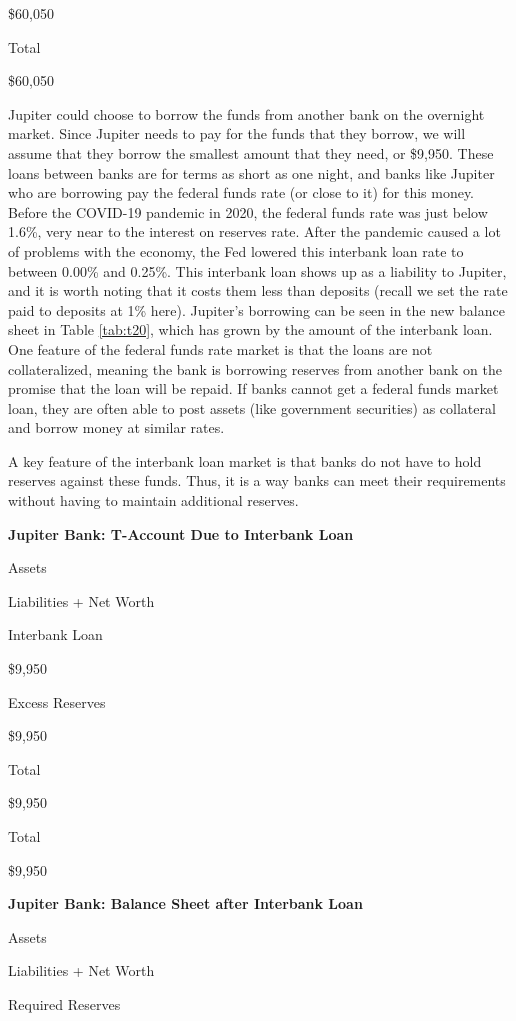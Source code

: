 \documentclass[
]{book}
\begin{document}
\$60,050

Total

\$60,050

Jupiter could choose to borrow the funds from another bank on the overnight market. Since Jupiter needs to pay for the funds that they borrow, we will assume that they borrow the smallest amount that they need, or \$9,950. These loans between banks are for terms as short as one night, and banks like Jupiter who are borrowing pay the federal funds rate (or close to it) for this money. Before the COVID-19 pandemic in 2020, the federal funds rate was just below 1.6\%, very near to the interest on reserves rate. After the pandemic caused a lot of problems with the economy, the Fed lowered this interbank loan rate to between 0.00\% and 0.25\%. This interbank loan shows up as a liability to Jupiter, and it is worth noting that it costs them less than deposits (recall we set the rate paid to deposits at 1\% here). Jupiter's borrowing can be seen in the new balance sheet in Table \ref{tab:t20}, which has grown by the amount of the interbank loan. One feature of the federal funds rate market is that the loans are not collateralized, meaning the bank is borrowing reserves from another bank on the promise that the loan will be repaid. If banks cannot get a federal funds market loan, they are often able to post assets (like government securities) as collateral and borrow money at similar rates.

A key feature of the interbank loan market is that banks do not have to hold reserves against these funds. Thus, it is a way banks can meet their requirements without having to maintain additional reserves.

\label{tab:t19}\textbf{Jupiter Bank: T-Account Due to Interbank Loan}

Assets

Liabilities + Net Worth

Interbank Loan

\$9,950

Excess Reserves

\$9,950

Total

\$9,950

Total

\$9,950

\label{tab:t20}\textbf{Jupiter Bank: Balance Sheet after Interbank Loan}

Assets

Liabilities + Net Worth

Required Reserves
\end{document}
